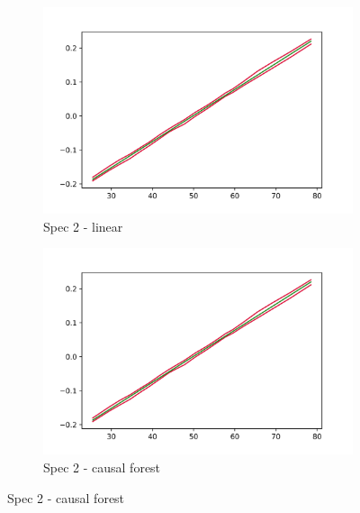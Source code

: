 \begin{figure}[h]
    \begin{subfigure}{0.5\linewidth}
        \includegraphics[width=\linewidth]{figures/ALE/chSNDexp/spec2_linear_AGE.png}
        \caption{Spec 2 - linear}
    \end{subfigure}%
    \begin{subfigure}{0.5\linewidth}
        \includegraphics[width=\linewidth]{figures/ALE/chSNDexp/spec2_linear_AGE.png}
        \caption{Spec 2 - causal forest}
    \end{subfigure}


\end{figure}
